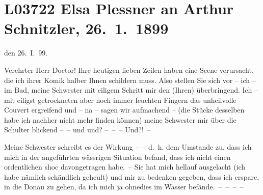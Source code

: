 

\section[Elsa Plessner an Arthur Schnitzler, 26. 1. 1899]{L03722 Elsa Plessner an Arthur Schnitzler, 26. 1. 1899}
\nopagebreak{}
\rehead{ }\normalsize\beginnumbering{}
\toendnotes[C]{\smallbreak\pagebreak[2]}
\toendnotes[C]{\smallbreak}
\toendnotes[C]{\smallbreak}
\pstart
           \centering{}{\pb}den 26. I. 99.\pend
           
\pstart{}Verehrter Herr Doctor!\pend\vspace{0.5em}
\pstart
           Ihre heutigen lieben Zeilen haben eine Scene
               verursacht, die ich ihrer Komik halber Ihnen schildern muss. Also stellen Sie sich
               vor – ich – im Bad, meine Schwester mit eiligem Schritt mir den \introOben{}(Ihren)\introOben{}{ }\label{K_L03722-1v}\label{K_L03722-1} überbringend. Ich – mit eiligst
               getrockneten  aber noch immer feuchten Fingern das
               unheilvolle Couvert ergreifend und – na – sagen wir aufmachend – (die Stücke
               desselben habe ich nachher nicht mehr finden können) meine Schwester mir über die Schulter blickend
               – – und {\pb}und? – – – Und?! –\pend
           
\pstart
           Meine Schwester schreibt es
               der Wirkung – – d. h. dem Umstande zu, dass ich mich in der angeführten wässrigen
               Situation befand, dass ich nicht einen ordentlichen shoc davongetragen habe. – Sie
               hat mich hellauf ausgelacht (ich habe nämlich schändlich geheult) und mir zu bedenken
               gegeben, dass ich erspare, in die Donau zu
               gehen, da ich mich ja ohnedies im Wasser befände. – – – –\pend
           
